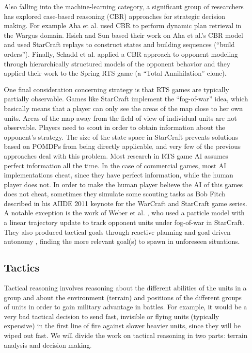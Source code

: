 \documentclass[journal]{IEEEtran}
\begin{document}
Also falling into the machine-learning category, a significant group of researchers has explored case-based reasoning (CBR) \cite{Aamodt94CBR} approaches for strategic decision making. For example Aha et al. \cite{LTW} used CBR to perform dynamic plan retrieval in the Wargus domain. Hsieh and Sun \cite{HsiehS08} based their work on Aha et al.'s CBR model \cite{LTW} and used StarCraft replays to construct states and building sequences (``build orders''). Finally, Schadd et al. \cite{SchaddBS07} applied a CBR approach to opponent modeling through hierarchically structured models of the opponent behavior and they applied their work to the Spring RTS game (a ``Total Annihilation'' clone).

One final consideration concerning strategy is that RTS games are typically partially observable. Games like StarCraft implement the ``fog-of-war'' idea, which basically means that a player can only see the areas of the map close to her own units. Areas of the map away from the field of view of individual units are not observable. Players need to scout in order to obtain information about the opponent's strategy. The size of the state space in StarCraft prevents solutions based on POMDPs from being directly applicable, and very few of the previous approaches deal with this problem. Most research in RTS game AI assumes perfect information all the time. In the case of commercial games, most AI implementations cheat, since they have perfect information, while the human player does not. In order to make the human player believe the AI of this games does not cheat, sometimes they simulate some scouting tasks as Bob Fitch described in his AIIDE 2011 keynote for the WarCraft and StarCraft game series. A notable exception is the work of Weber et al. \cite{WeberAIIDE11}, who used a particle model with a linear trajectory update to track opponent units under fog-of-war in StarCraft. They also produced tactical goals through reactive planning and goal-driven autonomy \cite{WeberCig10,Weber10}, finding the more relevant goal(s) to spawn in unforeseen situations. 


\subsection{Tactics}

Tactical reasoning involves reasoning about the different abilities of the units in a group and about the environment (terrain) and positions of the different groups of units in order to gain military advantage in battles. For example, it would be a very bad tactical decision to send fast, invisible or flying units (typically expensive) in the first line of fire against slower heavier units, since they will be wiped out fast. We will divide the work on tactical reasoning in two parts: terrain analysis and decision making.
\end{document}
